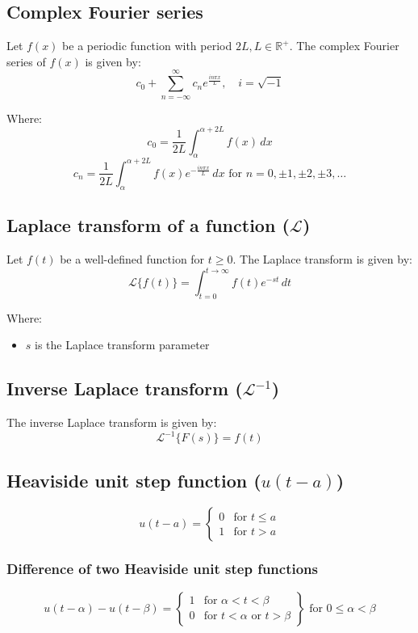 \documentclass[11pt]{article}
\begin{document}
\subsection{Complex Fourier series}
\label{sec:org102cd7f}
Let \(f(x)\) be a periodic function with period \(2L, L \in \mathbb{R}^{+}\). The complex Fourier series of \(f(x)\) is given by:
\[c_0 + \sum_{n = - \infty}^{\infty} c_n e^{\frac{i n \pi x}{L}}, \quad i = \sqrt{-1}\]

Where:
\[c_0 = \frac{1}{2L} \int_{\alpha}^{\alpha + 2L} f(x) \, dx\]
\[c_n = \frac{1}{2L} \int_{\alpha}^{\alpha + 2L} f(x) e^{- \frac{i n \pi x}{L}} \, dx \text{ for } n = 0, \pm 1, \pm 2, \pm 3, \ldots \]

\subsection{Laplace transform of a function (\(\mathcal{L}\))}
\label{sec:org600fed5}
Let \(f(t)\) be a well-defined function for \(t \ge 0\). The Laplace transform is given by:
\[\mathcal{L} \{ f(t) \} = \int_{t = 0}^{t \rightarrow \infty} f(t) e^{-st} \, dt\]

Where:
\begin{itemize}
\item \(s\) is the Laplace transform parameter
\end{itemize}

\subsection{Inverse Laplace transform (\(\mathcal{L}^{-1}\))}
\label{sec:orgf7c39aa}
The inverse Laplace transform is given by:
\[\mathcal{L}^{-1} \{ F(s) \} = f(t)\]

\subsection{Heaviside unit step function (\(u(t - a)\))}
\label{sec:orgfc51df2}
\label{org347bf95}
\begin{displaymath}
u(t - a) = \begin{cases}
0 & \text{for } t \le a \\
1 & \text{for } t > a
\end{cases}
\end{displaymath}

\subsubsection{Difference of two Heaviside unit step functions}
\label{sec:orge7ffa0b}
\begin{displaymath}
u(t - \alpha) - u(t - \beta) = \left. \begin{cases}
1 & \text{for } \alpha < t < \beta \\
0 & \text{for } t < \alpha \text{ or } t > \beta
\end{cases} \right\} \text{ for } 0 \le \alpha < \beta
\end{displaymath}
\end{document}
